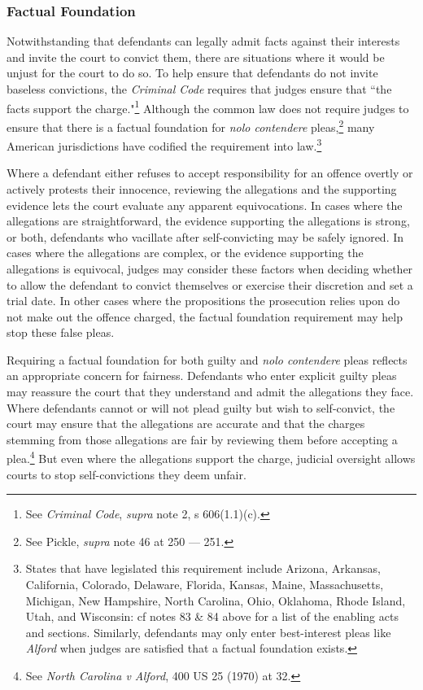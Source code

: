 \subsubsection{Factual Foundation}

Notwithstanding that defendants can legally admit facts against their interests and invite the court to convict them, there are situations where it would be unjust for the court to do so. To help ensure that defendants do not invite baseless convictions, the \textit{Criminal Code} requires that judges ensure that ``the facts support the charge."\footnote{See \textit{Criminal Code}, \textit{supra} note 2, s 606(1.1)(c).} Although the common law does not require judges to ensure that there is a factual foundation for \textit{nolo contendere} pleas,\footnote{See Pickle, \textit{supra} note 46 at 250 — 251.} many American jurisdictions have codified the requirement into law.\footnote{States that have legislated this requirement include Arizona, Arkansas, California, Colorado, Delaware, Florida, Kansas, Maine, Massachusetts, Michigan, New Hampshire, North Carolina, Ohio, Oklahoma, Rhode Island, Utah, and Wisconsin: cf notes 83 \& 84 above for a list of the enabling acts and sections. Similarly, defendants may only enter best-interest pleas like \textit{Alford} when judges are satisfied that a factual foundation exists.}

Where a defendant either refuses to accept responsibility for an offence overtly or actively protests their innocence, reviewing the allegations and the supporting evidence lets the court evaluate any apparent equivocations. In cases where the allegations are straightforward, the evidence supporting the allegations is strong, or both, defendants who vacillate after self-convicting may be safely ignored. In cases where the allegations are complex, or the evidence supporting the allegations is equivocal, judges may consider these factors when deciding whether to allow the defendant to convict themselves or exercise their discretion and set a trial date. In other cases where the propositions the prosecution relies upon do not make out the offence charged, the factual foundation requirement may help stop these false pleas.

Requiring a factual foundation for both guilty and \textit{nolo contendere} pleas reflects an appropriate concern for fairness. Defendants who enter explicit guilty pleas may reassure the court that they understand and admit the allegations they face. Where defendants cannot or will not plead guilty but wish to self-convict, the court may ensure that the allegations are accurate and that the charges stemming from those allegations are fair by reviewing them before accepting a plea.\footnote{See \textit{North Carolina v Alford}, 400 US 25 (1970) at 32.} But even where the allegations support the charge, judicial oversight allows courts to stop self-convictions they deem unfair.


